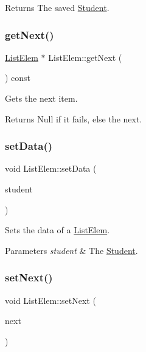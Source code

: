 \begin{DoxyReturn}{Returns}
The saved \hyperlink{class_student}{Student}. 
\end{DoxyReturn}
\mbox{\label{class_list_elem_ac615618c96d2bacc597ba59a4e8e2620}} 
\subsubsection{\texorpdfstring{get\+Next()}{getNext()}}
{\footnotesize\ttfamily \hyperlink{class_list_elem}{List\+Elem} $\ast$ List\+Elem\+::get\+Next (\begin{DoxyParamCaption}{ }\end{DoxyParamCaption}) const}



Gets the next item. 

\begin{DoxyReturn}{Returns}
Null if it fails, else the next. 
\end{DoxyReturn}
\mbox{\label{class_list_elem_a90be95fa85c9fb9ca4470bac30e4d504}} 
\subsubsection{\texorpdfstring{set\+Data()}{setData()}}
{\footnotesize\ttfamily void List\+Elem\+::set\+Data (\begin{DoxyParamCaption}\item[{const \hyperlink{class_student}{Student} \&}]{student }\end{DoxyParamCaption})}



Sets the data of a \hyperlink{class_list_elem}{List\+Elem}. 


\begin{DoxyParams}{Parameters}
{\em student} & The \hyperlink{class_student}{Student}. \\
\hline
\end{DoxyParams}
\mbox{\label{class_list_elem_a86b0a61e4fe56fdd0d9f75aec80636fc}} 
\subsubsection{\texorpdfstring{set\+Next()}{setNext()}}
{\footnotesize\ttfamily void List\+Elem\+::set\+Next (\begin{DoxyParamCaption}\item[{\hyperlink{class_list_elem}{List\+Elem} $\ast$const}]{next }\end{DoxyParamCaption})}



